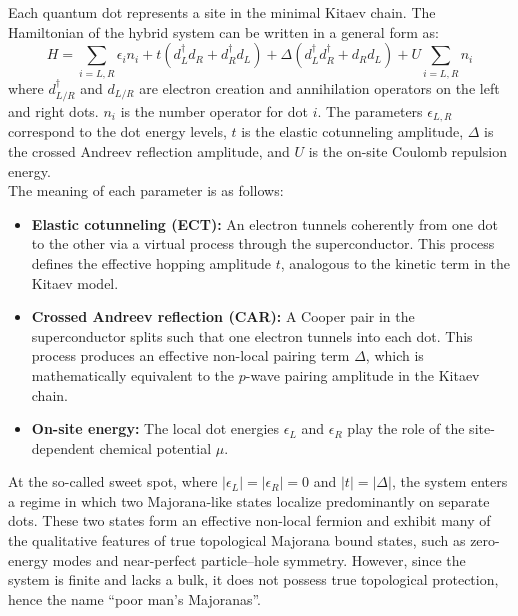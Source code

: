\documentclass[11pt, letterpaper, titlepage]{article}
\begin{document}
Each quantum dot represents a site in the minimal Kitaev chain. The Hamiltonian of the hybrid system can be written in a general form as:
\begin{equation}
H = \sum_{i=L,R} \epsilon_i n_i
+ t (d_L^\dagger d_R + d_R^\dagger d_L)
+ \Delta (d_L^\dagger d_R^\dagger + d_R d_L)
+ U \sum_{i=L,R} n_i
\label{eq:qdsqdh}
\end{equation}
where $d_{L/R}^\dagger$ and $d_{L/R}$ are electron creation and annihilation operators on the left and right dots. $n_i$ is the number operator for dot $i$. The parameters $ϵ_{L,R}$ correspond to the dot energy levels, $t$ is the elastic cotunneling amplitude, $Δ$ is the crossed Andreev reflection amplitude, and $U$ is the on-site Coulomb repulsion energy.\\
The meaning of each parameter is as follows:
\begin{itemize}
    \item \textbf{Elastic cotunneling (ECT):} An electron tunnels coherently from one dot to the other via a virtual process through the superconductor. This process defines the effective hopping amplitude $t$, analogous to the kinetic term in the Kitaev model.
    \item \textbf{Crossed Andreev reflection (CAR):} A Cooper pair in the superconductor splits such that one electron tunnels into each dot. This process produces an effective non-local pairing term $\Delta$, which is mathematically equivalent to the $p$-wave pairing amplitude in the Kitaev chain.
    \item \textbf{On-site energy:} The local dot energies $\epsilon_L$ and $\epsilon_R$ play the role of the site-dependent chemical potential $\mu$.
\end{itemize}
At the so-called sweet spot, where $|\epsilon_L| = |\epsilon_R| = 0$ and $|t| = |\Delta|$, the system enters a regime in which two Majorana-like states localize predominantly on separate dots. These two states form an effective non-local fermion and exhibit many of the qualitative features of true topological Majorana bound states, such as zero-energy modes and near-perfect particle–hole symmetry. However, since the system is finite and lacks a bulk, it does not possess true topological protection, hence the name “poor man’s Majoranas”. \cite{Qtech}
\end{document}
